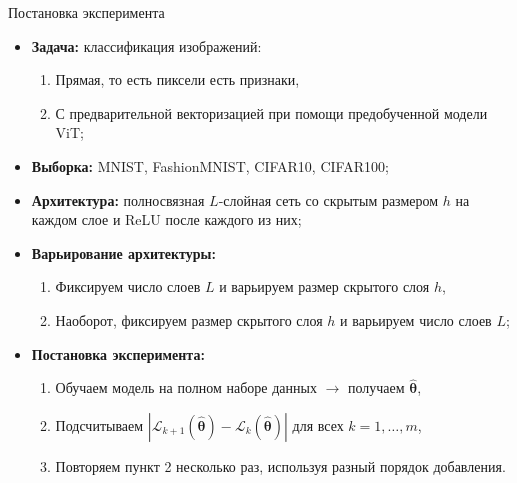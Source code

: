\documentclass[aspectratio=169]{beamer}
\begin{document}
\begin{frame}{Постановка эксперимента}
    \begin{itemize}
        \item \textbf{Задача:} классификация изображений:
        \begin{enumerate}
            \item Прямая, то есть пиксели есть признаки,
            \item С предварительной векторизацией при помощи предобученной модели ViT;
        \end{enumerate}
        \item \textbf{Выборка:} MNIST, FashionMNIST, CIFAR10, CIFAR100;
        \item \textbf{Архитектура:} полносвязная $L$-слойная сеть со скрытым размером $h$ на каждом слое и ReLU после каждого из них;
        \item \textbf{Варьирование архитектуры:}
        \begin{enumerate}
            \item Фиксируем число слоев $L$ и варьируем размер скрытого слоя $h$,
            \item Наоборот, фиксируем размер скрытого слоя $h$ и варьируем число слоев $L$;
        \end{enumerate}
        \item \textbf{Постановка эксперимента:}
        \begin{enumerate}
            \item Обучаем модель на полном наборе данных $\to$ получаем $\hat{\boldsymbol{\theta}}$,
            \item Подсчитываем $\left| \mathcal{L}_{k+1}(\hat{\boldsymbol{\theta}}) - \mathcal{L}_k(\hat{\boldsymbol{\theta}}) \right|$ для всех $k = 1, \ldots, m$,
            \item Повторяем пункт 2 несколько раз, используя разный порядок добавления.
        \end{enumerate}
    \end{itemize}
\end{frame}
\end{document}

